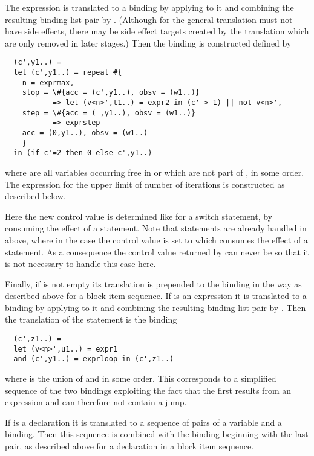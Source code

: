 The expression  is translated to a binding  by applying  to it and combining 
the resulting binding list pair by . (Although for the general translation  must not have side effects, there
may be side effect targets  created by the translation which are only removed in later stages.)
Then the binding  is constructed defined by
\begin{verbatim}
  (c',y1..) =
  let (c',y1..) = repeat #{
    n = exprmax,
    stop = \#{acc = (c',y1..), obsv = (w1..)} 
           => let (v<n>',t1..) = expr2 in (c' > 1) || not v<n>',
    step = \#{acc = (_,y1..), obsv = (w1..)} 
           => exprstep
    acc = (0,y1..), obsv = (w1..)
    }
  in (if c'=2 then 0 else c',y1..)
\end{verbatim}
where  are all variables occurring free in  or  which are not part of , in some order.
The expression  for the upper limit of number of iterations is constructed as described below.

Here the new control value is determined like for a switch statement, by consuming the effect of a  statement. Note that
 statements are already handled in  above, where in the  case the control
value is set to  which consumes the effect of a  statement. As a consequence the control value returned by
 can never be  so that it is not necessary to handle this case here.

Finally, if  is not empty its translation is prepended to the binding  in the way as described 
above for a block item sequence. If  is an expression it is translated to a binding  by 
applying  to it and 
combining the resulting binding list pair by . Then the translation of the  statement is the binding
\begin{verbatim}
  (c',z1..) = 
  let (v<n>',u1..) = expr1
  and (c',y1..) = exprloop in (c',z1..)
\end{verbatim}
where  is the union of  and  in some order. This corresponds to a simplified sequence of the two 
bindings exploiting the fact that the first results from an expression and can therefore not contain a jump.

If  is a declaration it is translated to a sequence of pairs of a variable and a binding. Then this sequence is combined
with the binding  beginning with the last pair, as described above for a declaration in a block item
sequence.

